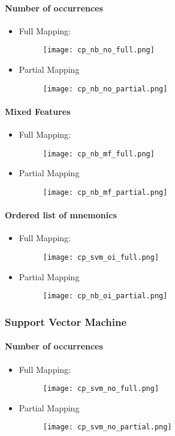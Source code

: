 \documentclass[a4paper]{article}
\begin{document}
\paragraph{Number of occurrences}
\begin{itemize}
\item Full Mapping:
\begin{figure} [h!]
  \texttt{[image: cp\_nb\_no\_full.png]}
\end{figure}
\item Partial Mapping
\begin{figure} [h!]
  \texttt{[image: cp\_nb\_no\_partial.png]}
\end{figure}
\end{itemize}

\paragraph{Mixed Features}
\begin{itemize}
\item Full Mapping:
\begin{figure} [h!]
  \texttt{[image: cp\_nb\_mf\_full.png]}
\end{figure}
\item Partial Mapping
\begin{figure} [h!]
  \texttt{[image: cp\_nb\_mf\_partial.png]}
\end{figure}
\end{itemize}

\newpage
\paragraph{Ordered list of mnemonics}
\begin{itemize}
\item Full Mapping:
\begin{figure} [h!]
  \texttt{[image: cp\_svm\_oi\_full.png]}
\end{figure}
\item Partial Mapping
\begin{figure} [h!]
  \texttt{[image: cp\_nb\_oi\_partial.png]}
\end{figure}
\end{itemize}

\subsubsection{Support Vector Machine}
\paragraph{Number of occurrences}
\begin{itemize}
\item Full Mapping:
\begin{figure} [h!]
  \texttt{[image: cp\_svm\_no\_full.png]}
\end{figure}
\item Partial Mapping
\begin{figure} [h!]
  \texttt{[image: cp\_svm\_no\_partial.png]}
\end{figure}
\end{itemize}
\end{document}
